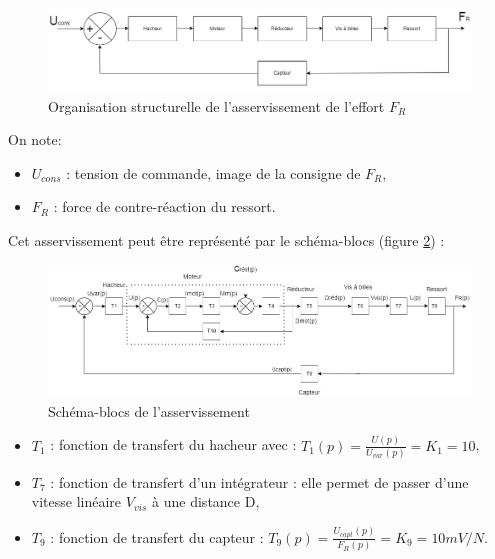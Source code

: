 \begin{figure}[ht!]
\begin{center}
 \includegraphics[width=.95\linewidth]{img/fig19}
\end{center}
\caption{\label{fig19} Organisation structurelle de l'asservissement de l'effort $F_R$}
\end{figure}

\newpage

On note:
\begin{itemize}
 \item $U_{cons}$ : tension de commande, image de la consigne de $F_R$,
 \item $F_R$ : force de contre-réaction du ressort.
\end{itemize}

Cet asservissement peut être représenté par le schéma-blocs (figure \ref{fig20}) :

\begin{figure}[ht!]
\begin{center}
 \includegraphics[width=\linewidth]{img/fig20}
\end{center}
\caption{\label{fig20} Schéma-blocs de l'asservissement}
\end{figure}

\begin{itemize}
 \item $T_1$ : fonction de transfert du hacheur avec : $T_1(p)=\frac{U(p)}{U_{var}(p)}=K_1=10$,
 \item $T_7$ : fonction de transfert d'un intégrateur : elle permet de passer d'une vitesse linéaire $V_{vis}$ à une distance D,
 \item $T_9$ : fonction de transfert du capteur : $T_9(p)=\frac{U_{capt}(p)}{F_R(p)}=K_9=10mV/N$.
\end{itemize}
 
